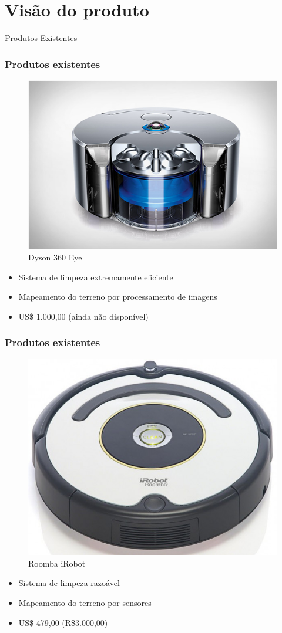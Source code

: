 \documentclass{beamer}
\begin{document}
\section{Visão do produto}
\begin{frame}
	Produtos Existentes	
\end{frame}

\begin{frame}
  \frametitle{Produtos existentes}
  \begin{figure}[ht]
  \includegraphics[width=.4\textwidth]{images/dyson_360.jpg}
  \caption{Dyson 360 Eye}
  \end{figure}
  \begin{itemize}
  	\item Sistema de limpeza extremamente eficiente
  	\item Mapeamento do terreno por processamento de imagens
  	\item US\$ 1.000,00 (ainda não disponível)
  \end{itemize}
\end{frame}

\begin{frame}
  \frametitle{Produtos existentes}
  \begin{figure}[ht]
  \includegraphics[width=.4\textwidth]{images/irobot.jpg}
  \caption{Roomba iRobot}
  \end{figure}
  \begin{itemize}
  	\item Sistema de limpeza razoável
  	\item Mapeamento do terreno por sensores
  	\item US\$ 479,00 (R\$3.000,00)
  \end{itemize}
\end{frame}
\end{document}
